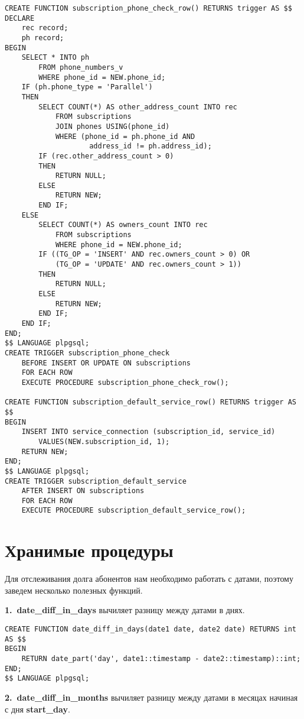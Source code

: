 \documentclass{report}
\begin{document}
\begin{lstlisting}
CREATE FUNCTION subscription_phone_check_row() RETURNS trigger AS $$
DECLARE
    rec record;
    ph record;
BEGIN
    SELECT * INTO ph 
        FROM phone_numbers_v 
        WHERE phone_id = NEW.phone_id;
    IF (ph.phone_type = 'Parallel')
    THEN
        SELECT COUNT(*) AS other_address_count INTO rec 
            FROM subscriptions 
            JOIN phones USING(phone_id)
            WHERE (phone_id = ph.phone_id AND 
                    address_id != ph.address_id);
        IF (rec.other_address_count > 0)
        THEN 
            RETURN NULL;
        ELSE 
            RETURN NEW;
        END IF;
    ELSE
        SELECT COUNT(*) AS owners_count INTO rec 
            FROM subscriptions 
            WHERE phone_id = NEW.phone_id;
        IF ((TG_OP = 'INSERT' AND rec.owners_count > 0) OR 
            (TG_OP = 'UPDATE' AND rec.owners_count > 1))
        THEN 
            RETURN NULL;
        ELSE 
            RETURN NEW;
        END IF;
    END IF;
END;
$$ LANGUAGE plpgsql;
CREATE TRIGGER subscription_phone_check 
    BEFORE INSERT OR UPDATE ON subscriptions
    FOR EACH ROW 
    EXECUTE PROCEDURE subscription_phone_check_row();

CREATE FUNCTION subscription_default_service_row() RETURNS trigger AS $$
BEGIN
    INSERT INTO service_connection (subscription_id, service_id)
        VALUES(NEW.subscription_id, 1);
    RETURN NEW;
END;
$$ LANGUAGE plpgsql;
CREATE TRIGGER subscription_default_service
    AFTER INSERT ON subscriptions
    FOR EACH ROW 
    EXECUTE PROCEDURE subscription_default_service_row();
\end{lstlisting}

\section{Хранимые процедуры}

Для отслеживания долга абонентов нам необходимо
работать с датами, поэтому заведем несколько 
полезных функций.

\textbf{1.\ date\_diff\_in\_days} вычиляет разницу между 
датами в днях. 

\begin{lstlisting} 
CREATE FUNCTION date_diff_in_days(date1 date, date2 date) RETURNS int AS $$
BEGIN
    RETURN date_part('day', date1::timestamp - date2::timestamp)::int;
END;
$$ LANGUAGE plpgsql;
\end{lstlisting}

\textbf{2.\ date\_diff\_in\_months} вычиляет разницу между 
датами в месяцах начиная с дня \textbf{start\_day}. 
\end{document}
